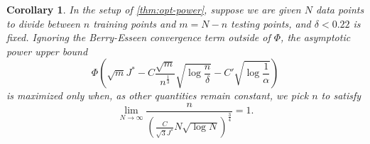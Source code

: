 \documentclass{article}
\newtheorem{corollary}[theorem]{Corollary} \crefname{corollary}{Corollary}{Corollaries}
\begin{document}
\begin{corollary} \label{thm:opt-power-rate}
    In the setup of \cref{thm:opt-power},
    suppose we are given $N$ data points to divide between
    $n$ training points
    and $m = N - n$ testing points,
    and $\delta < 0.22$ is fixed.
    Ignoring the Berry-Esseen convergence term outside of $\Phi$,
    the asymptotic power upper bound
    \[
       \Phi\left(
             \sqrt{m} J^*
           - C \frac{\sqrt m}{n^{\frac13}} \sqrt{\log\frac{n}{\delta}}
           - C' \sqrt{\log\frac1\alpha}
           \right)
    \]
    is maximized only when,
    as other quantities remain constant,
    we pick $n$ to satisfy
    \[
        \lim_{N \to \infty}
        \frac{n}{
            \left( \frac{C}{\sqrt{3} J^*} N \sqrt{\log N} \right)^{\frac34}
        } = 1
.\]
\end{corollary}
\end{document}
